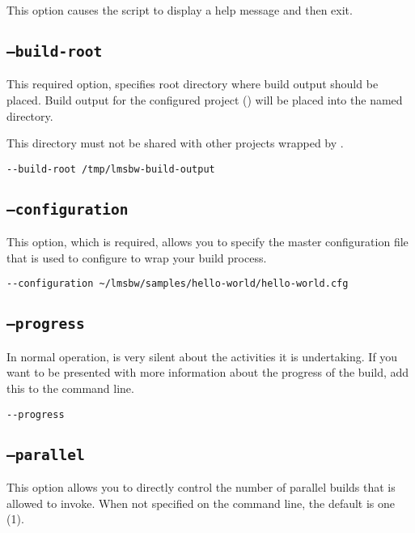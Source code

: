 This option causes the script to display a help message and then exit.

\subsection{\texttt{--build-root}}

This required option, specifies root directory where build output
should be placed.  Build output for the configured project
() will be placed into the named directory.

This directory must not be shared with other projects wrapped by
\lmsbw.

\begin{verbatim}
--build-root /tmp/lmsbw-build-output
\end{verbatim}

\subsection{\texttt{--configuration}}\label{lmsbw:configuration}

This option, which is required, allows you to specify the master
configuration file that is used to configure \lmsbw to wrap your build
process.

\begin{verbatim}
--configuration ~/lmsbw/samples/hello-world/hello-world.cfg
\end{verbatim}


\subsection{\texttt{--progress}}

In normal operation, \lmsbw is very silent about the activities it is
undertaking.  If you want to be presented with more information about
the progress of the build, add this to the command line.

\begin{verbatim}
--progress
\end{verbatim}

\subsection{\texttt{--parallel}}

This option allows you to directly control the number of parallel
builds that \make is allowed to invoke.  When not specified on the
command line, the default is one (1).

